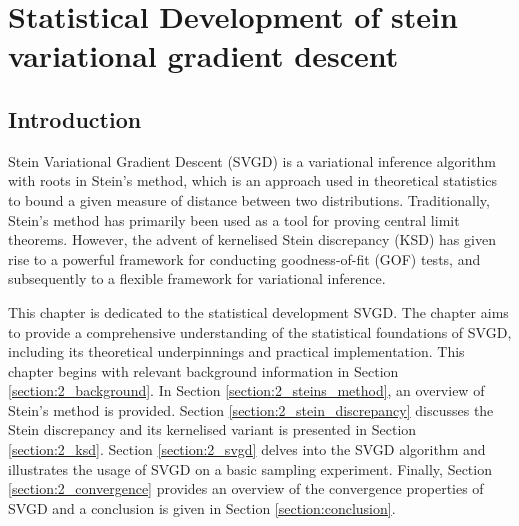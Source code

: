 \chapter{Statistical Development of stein variational gradient descent}
\label{chap:svgd}
\section{Introduction}

Stein Variational Gradient Descent (SVGD) \citep{liu_svgd} is a variational inference algorithm with roots in Stein’s method, which is an approach used in theoretical statistics to bound a given measure of distance between two distributions. Traditionally, Stein’s method has primarily been used as a tool for proving central limit theorems. However, the advent of kernelised Stein discrepancy (KSD) \citep{liu_ksd, chwialkowski_ksd} has given rise to a powerful framework for conducting goodness-of-fit (GOF) tests, and subsequently to a flexible framework for variational inference. 


This chapter is dedicated to the statistical development SVGD.  The chapter aims to provide a comprehensive understanding of the statistical foundations of SVGD, including its theoretical underpinnings and practical implementation. This chapter begins with relevant background information in Section \ref{section:2_background}. In Section \ref{section:2_steins_method}, an overview of Stein's method is provided. Section \ref{section:2_stein_discrepancy} discusses the Stein discrepancy and its kernelised variant is presented in Section \ref{section:2_ksd}. Section \ref{section:2_svgd} delves into the SVGD algorithm and illustrates the usage of SVGD on a basic sampling experiment. Finally, Section \ref{section:2_convergence} provides an overview of the convergence properties of SVGD and a conclusion is given in Section \ref{section:conclusion}.

